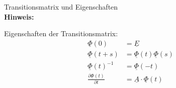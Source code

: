 \begin{question}[section=2,name={Transitionsmatrix},difficulty=3,type=mdl,tags={}]
	Transitionsmatrix und Eigenschaften
	\\ \textbf{Hinweis:}\\
	
\end{question}
\begin{solution}
	Eigenschaften der Transitionsmatrix:
	\begin{align}
		\underline{\Phi}(0) &= \underline E\\
		\underline{\Phi}(t+s) &= \underline{\Phi}(t)\underline{\Phi}(s)\\
		\underline{\Phi}(t)^{-1} &=\underline{\Phi}(-t)\\
		\frac{\partial \underline{\Phi}(t)}{\partial t} &= \underline A \cdot \underline{\Phi}(t)
	\end{align}
\end{solution}